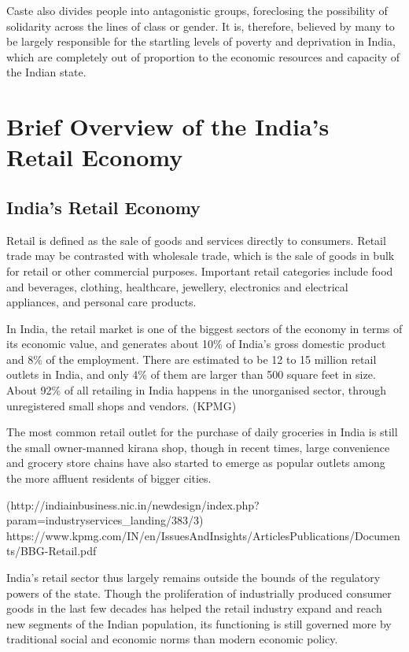 \documentclass[12pt,a4paper,titlepage]{report}
\begin{document}
Caste also divides people into antagonistic groups, foreclosing the
possibility of solidarity across the lines of class or gender. It is,
therefore, believed by many to be largely responsible for the startling
levels of poverty and deprivation in India, which are completely out of
proportion to the economic resources and capacity of the Indian state.

\section{Brief Overview of the India's Retail
Economy}\label{brief-overview-of-the-indias-retail-economy}

\subsection{India's Retail Economy}\label{indias-retail-economy}

Retail is defined as the sale of goods and services directly to
consumers. Retail trade may be contrasted with wholesale trade, which is
the sale of goods in bulk for retail or other commercial purposes.
Important retail categories include food and beverages, clothing,
healthcare, jewellery, electronics and electrical appliances, and
personal care products.

In India, the retail market is one of the biggest sectors of the economy
in terms of its economic value, and generates about 10\% of India's
gross domestic product and 8\% of the employment. There are estimated to
be 12 to 15 million retail outlets in India, and only 4\% of them are
larger than 500 square feet in size. About 92\% of all retailing in
India happens in the unorganised sector, through unregistered small
shops and vendors. (KPMG)

The most common retail outlet for the purchase of daily groceries in
India is still the small owner-manned kirana shop, though in recent
times, large convenience and grocery store chains have also started to
emerge as popular outlets among the more affluent residents of bigger
cities.

(http://indiainbusiness.nic.in/newdesign/index.php?param=industryservices\_landing/383/3)
https://www.kpmg.com/IN/en/IssuesAndInsights/ArticlesPublications/Documents/BBG-Retail.pdf

India's retail sector thus largely remains outside the bounds of the
regulatory powers of the state. Though the proliferation of industrially
produced consumer goods in the last few decades has helped the retail
industry expand and reach new segments of the Indian population, its
functioning is still governed more by traditional social and economic
norms than modern economic policy.
\end{document}
